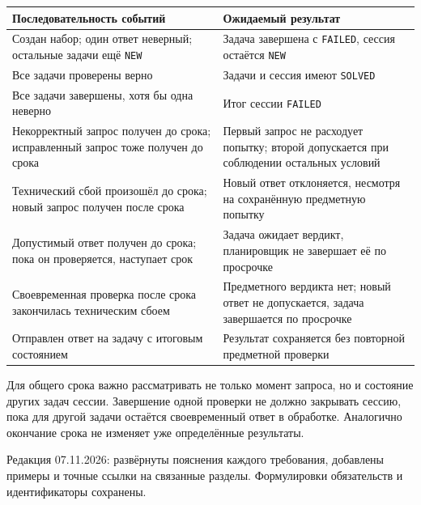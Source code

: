\documentclass[12pt,a4paper]{article}
\begin{document}
{\def\LTcaptype{none} %
\begin{longtable}[]{@{}
  >{\raggedright\arraybackslash}p{}
  >{\raggedright\arraybackslash}p{}@{}}
\toprule\noalign{}
\begin{minipage}[b]{\linewidth}\raggedright
Последовательность событий
\end{minipage} & \begin{minipage}[b]{\linewidth}\raggedright
Ожидаемый результат
\end{minipage} \\
\midrule\noalign{}
\endhead
\bottomrule\noalign{}
\endlastfoot
Создан набор; один ответ неверный; остальные задачи ещё \texttt{NEW} & Задача завершена с \texttt{FAILED}, сессия остаётся \texttt{NEW} \\
Все задачи проверены верно & Задачи и сессия имеют \texttt{SOLVED} \\
Все задачи завершены, хотя бы одна неверно & Итог сессии \texttt{FAILED} \\
Некорректный запрос получен до срока; исправленный запрос тоже получен до срока & Первый запрос не расходует попытку; второй допускается при соблюдении остальных условий \\
Технический сбой произошёл до срока; новый запрос получен после срока & Новый ответ отклоняется, несмотря на сохранённую предметную попытку \\
Допустимый ответ получен до срока; пока он проверяется, наступает срок & Задача ожидает вердикт, планировщик не завершает её по просрочке \\
Своевременная проверка после срока закончилась техническим сбоем & Предметного вердикта нет; новый ответ не допускается, задача завершается по просрочке \\
Отправлен ответ на задачу с итоговым состоянием & Результат сохраняется без повторной предметной проверки \\
\end{longtable}
}

Для общего срока важно рассматривать не только момент запроса, но и состояние других задач сессии. Завершение одной проверки не должно закрывать сессию, пока для другой задачи остаётся своевременный ответ в обработке. Аналогично окончание срока не изменяет уже определённые результаты.

Редакция 07.11.2026: развёрнуты пояснения каждого требования, добавлены примеры и точные ссылки на связанные разделы. Формулировки обязательств и идентификаторы сохранены.
\end{document}
